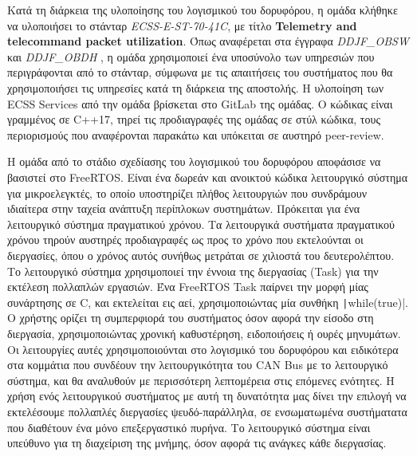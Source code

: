\documentclass[a4paper,nobib,justified]{tufte-book}
\begin{document}
Κατά τη διάρκεια της υλοποίησης του λογισμικού του δορυφόρου, η ομάδα κλήθηκε να υλοποιήσει το στάνταρ \emph{ECSS-E-ST-70-41C}, με τίτλο \textbf{Telemetry and telecommand packet utilization}. Όπως αναφέρεται στα έγγραφα \emph{DDJF\_OBSW}  και \emph{DDJF\_OBDH} , η ομάδα χρησιμοποιεί ένα υποσύνολο των υπηρεσιών που περιγράφονται από το στάνταρ, σύμφωνα με τις απαιτήσεις του συστήματος που θα χρησιμοποιήσει τις υπηρεσίες κατά τη διάρκεια της αποστολής. Η υλοποίηση των ECSS Services από την ομάδα βρίσκεται στο GitLab της ομάδας.  Ο κώδικας είναι γραμμένος σε C++17, τηρεί τις προδιαγραφές της ομάδας σε στύλ κώδικα, τους περιορισμούς που αναφέρονται παρακάτω και υπόκειται σε αυστηρό peer-review.


\par Η ομάδα από το στάδιο σχεδίασης του λογισμικού του δορυφόρου αποφάσισε να βασιστεί στο FreeRTOS. Είναι ένα δωρεάν και ανοικτού κώδικα λειτουργικό σύστημα για μικροελεγκτές, το οποίο υποστηρίζει πλήθος λειτουργιών που συνδράμουν ιδιαίτερα στην ταχεία ανάπτυξη περίπλοκων συστημάτων. Πρόκειται για ένα λειτουργικό σύστημα πραγματικού χρόνου. Τα λειτουργικά συστήματα πραγματικού χρόνου τηρούν αυστηρές προδιαγραφές ως προς το χρόνο που εκτελούνται οι διεργασίες, όπου ο χρόνος αυτός συνήθως μετράται σε χιλιοστά του δευτερολέπτου. Το λειτουργικό σύστημα χρησιμοποιεί την έννοια της διεργασίας (Task) για την εκτέλεση πολλαπλών εργασιών.  Ένα FreeRTOS Task παίρνει την μορφή μίας συνάρτησης σε C, και εκτελείται εις αεί, χρησιμοποιώντας μία συνθήκη \texttt|while(true)|. Ο χρήστης ορίζει τη συμπερφιορά του συστήματος όσον αφορά την είσοδο στη διεργασία, χρησιμοποιώντας χρονική καθυστέρηση, ειδοποιήσεις ή ουρές μηνυμάτων. Οι λειτουργίες αυτές χρησιμοποιούνται στο λογισμικό του δορυφόρου και ειδικότερα στα κομμάτια που συνδέουν την λειτουργικότητα του CAN Bus με το λειτουργικό σύστημα, και θα αναλυθούν με περισσότερη λεπτομέρεια στις επόμενες ενότητες. Η χρήση ενός λειτουργικού συστήματος με αυτή τη δυνατότητα μας δίνει την επιλογή να εκτελέσουμε πολλαπλές διεργασίες ψευδό-παράλληλα, σε ενσωματωμένα συστήματατα που διαθέτουν ένα μόνο επεξεργαστικό πυρήνα. Το λειτουργικό σύστημα είναι υπεύθυνο για τη διαχείριση της μνήμης, όσον αφορά τις ανάγκες κάθε διεργασίας.
\end{document}
